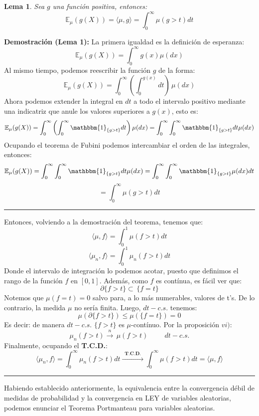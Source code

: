 \documentclass[a4paper]{article}
\newtheorem{lem}{Lema}
\numberwithin{equation}{subsection}
\def\E{\mathbb E}
\begin{document}
\begin{lem} Sea $g$ una función positiva, entonces:
    \begin{equation}
        \E_{\mu}(g(X)) = \langle\mu,g\rangle = \int_0^{\infty}\mu(g>t)dt
    \end{equation}
\end{lem}
\textbf{Demostración (Lema 1):} La primera igualdad es la definición de esperanza:
\[\E_{\mu}(g(X)) = \int_{0}^{\infty}g(x)\mu(dx)\]
Al mismo tiempo, podemos reescribir la función $g$ de la forma:
\[\E_{\mu}(g(X)) = \int_{0}^{\infty}\left(\int_{0}^{g(x)}dt\right)\,\mu(dx)\]
Ahora podemos extender la integral en $dt$ a todo el intervalo positivo mediante una indicatriz que anule los valores superiores a $g(x)$, esto es:
\[\E_{\mu}(g(X)) = \int_{0}^{\infty}\left(\int_{0}^{\infty}\mathbbm{1}_{\{g>t\}}dt\right)\mu(dx) = \int_{0}^{\infty}\int_{0}^{\infty}\mathbbm{1}_{\{g>t\}}dt\mu(dx)\]
Ocupando el teorema de Fubini podemos intercambiar el orden de las integrales, entonces:
\[\E_{\mu}(g(X)) = \int_{0}^{\infty}\int_{0}^{\infty}\mathbbm{1}_{\{g>t\}}dt\mu(dx) = \int_{0}^{\infty}\int_{0}^{\infty}\mathbbm{1}_{\{g>t\}}\mu(dx)dt \]
\[ = \int_{0}^{\infty}\mu(g>t)dt\]
\rule{0.7em}{0.7em}

Entonces, volviendo a la demostración del teorema, tenemos que:
\[\langle \mu,f\rangle = \int_{0}^{1}\mu(f>t)dt\]
\[\langle \mu_n , f \rangle = \int_{0}^{1}\mu_n(f>t)dt\]
Donde el intervalo de integración lo podemos acotar, puesto que definimos el rango de la función $f$ en $[0,1]$. Además, como $f$ es contínua, es fácil ver que:
\[\partial \{f>t\} \subset\,\{f=t\}\]
Notemos que $\mu(f=t)=0$ salvo para, a lo más numerables, valores de t's. De lo contrario, la medida $\mu$ no sería finita. Luego, $dt-c.s.$ tenemos:
\[\mu(\partial\{f>t\}) \leq \mu(\{f=t\}) = 0\]
Es decir: de manera $dt-c.s.$ $\{f>t\}$ es $\mu$-contínuo. Por la proposición $vi)$:
\[\mu_n(f>t) \xrightarrow{\,\,n\,\,}\,\mu(f>t)\hspace{1cm}dt-c.s.\]
Finalmente, ocupando el \textbf{T.C.D.}:
\[\langle\mu_n,f\rangle = \int_{0}^{\infty}\mu_n(f>t)dt \xrightarrow{\,\,\,\textbf{T.C.D.}\,\,\,}\int_{0}^{\infty}\mu(f>t)dt = \langle \mu,f\rangle\]
\rule{0.7em}{0.7em}

Habiendo establecido anteriormente, la equivalencia entre la convergencia débil de medidas de probabilidad y la convergencia en LEY de variables aleatorias, podemos enunciar el Teorema Portmanteau para variables aleatorias.
\end{document}
